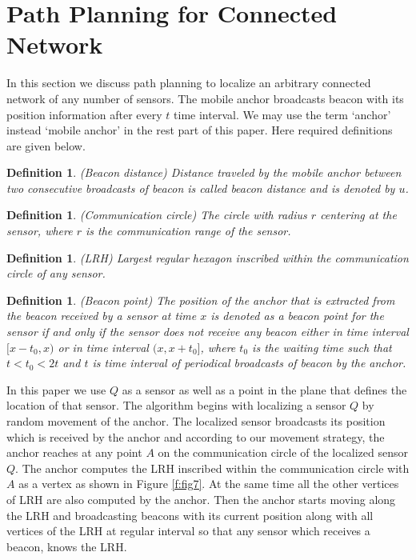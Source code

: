 \documentclass[preprint,11pt]{elsarticle}
\newtheorem{definition}[theorem]{Definition}
\begin{document}
\section{Path Planning for Connected Network}
\label{sec:tech1}
In this section we discuss path planning to localize an arbitrary connected network of any number of sensors.
The mobile anchor broadcasts beacon with its position information after every $t$ time interval.
We may use the term `anchor' instead `mobile anchor' in the rest part of this paper. Here required definitions are given below.
\begin{definition}
{\rm(}Beacon distance{\rm)} Distance traveled by the mobile anchor between two consecutive broadcasts
of beacon is called {\it beacon distance} and is denoted by $u$.
\end{definition}
\begin{definition}
{\rm(}Communication circle{\rm)} The circle with radius $r$ centering at the sensor, where $r$ is the communication range of the sensor.
\end{definition}
\begin{definition}
{\rm(}LRH{\rm)} Largest regular hexagon inscribed within the communication circle of any sensor.
\end{definition}
\begin{definition}
{\rm(}Beacon point{\rm)}
The position of the anchor that is extracted from the beacon received by a sensor at time $x$ is denoted as a beacon point for the sensor if and only if the sensor does not receive any beacon either in time interval $[x-t_0, x)$ or in time interval $(x, x+t_0]$, where $t_0$ is the waiting time such that $t<t_0<2t$ and $t$ is time interval of periodical broadcasts of beacon by the anchor.
\end{definition}
In this paper we use $Q$ as a sensor as well as a point in the plane that defines the location of that sensor.
The algorithm begins with localizing a sensor $Q$ by random movement of the anchor.
The localized sensor broadcasts its position which is received by the anchor and according to our movement strategy,
the anchor reaches at any point $A$ on the communication circle of the localized sensor $Q$.
The anchor computes the LRH inscribed within the communication circle with $A$ as a vertex as shown in Figure \ref{f:fig7}. At the same time all the other vertices of LRH are also computed by the anchor. Then the anchor starts moving along the LRH and broadcasting beacons with its current position along with all vertices of the LRH at regular interval so that any sensor which receives a beacon, knows the LRH.
\end{document}
